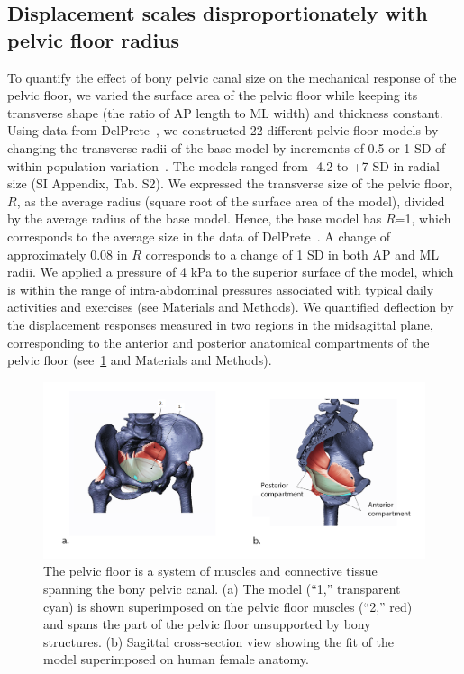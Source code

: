 \documentclass[9pt,twocolumn,twoside]{pnas-new}
\begin{document}
\subsection*{Displacement scales disproportionately with pelvic floor radius}
To quantify the effect of bony pelvic canal size on the mechanical response of the pelvic floor, we varied the surface area of the pelvic floor while keeping its transverse shape (the ratio of AP length to ML width) and thickness constant. Using data from DelPrete~\cite{DelPrete2019-ff}, we constructed 22 different pelvic floor models by changing the transverse radii of the base model by increments of 0.5 or 1 SD of within-population variation~\cite{DelPrete2019-ff}. The models ranged from -4.2 to +7 SD in radial size (SI Appendix, Tab. S2). We expressed the transverse size of the pelvic floor, $R$, as the average radius (square root of the surface area of the model), divided by the average radius of the base model. Hence, the base model has $R$=1, which corresponds to the average size in the data of DelPrete~\cite{DelPrete2019-ff}. A change of approximately 0.08 in $R$ corresponds to a change of 1 SD in both AP and ML radii. We applied a pressure of 4 kPa to the superior surface of the model, which is within the range of intra-abdominal pressures associated with typical daily activities and exercises (see Materials and Methods). We quantified deflection by the displacement responses measured in two regions in the midsagittal plane, corresponding to the anterior and posterior anatomical compartments of the pelvic floor (see~\cref{fig:pelvic-floor} and Materials and Methods). 

\begin{figure}%
\centering
\includegraphics[width=\linewidth]{figs/fig1}
\caption{The pelvic floor is a system of muscles and connective tissue spanning the bony pelvic canal. (a) The model (``1,” transparent cyan) is shown superimposed on the pelvic floor muscles (``2,” red) and spans the part of the pelvic floor unsupported by bony structures. (b) Sagittal cross-section view showing the fit of the model superimposed on human female anatomy.}
\label{fig:pelvic-floor}
\end{figure}
\end{document}
